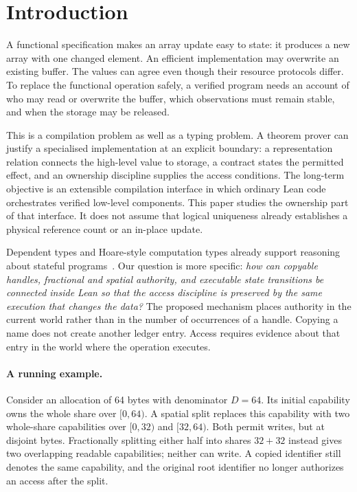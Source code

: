 \documentclass[a4paper,UKenglish,cleveref]{lipics-v2021}
\begin{document}
\section{Introduction}

A functional specification makes an array update easy to state: it produces a
new array with one changed element. An efficient implementation may overwrite
an existing buffer. The values can agree even though their resource protocols
differ. To replace the functional operation safely, a verified program needs an
account of who may read or overwrite the buffer, which observations must remain
stable, and when the storage may be released.

This is a compilation problem as well as a typing problem. A theorem prover can
justify a specialised implementation at an explicit boundary: a representation
relation connects the high-level value to storage, a contract states the
permitted effect, and an ownership discipline supplies the access conditions.
The long-term objective is an extensible compilation interface in which ordinary
Lean code orchestrates verified low-level components. This paper studies the
ownership part of that interface. It does not assume that logical uniqueness
already establishes a physical reference count or an in-place update.

Dependent types and Hoare-style computation types already support reasoning
about stateful programs~\cite{htt,ynot,steelcore}. Our question is more specific:
\emph{how can copyable handles, fractional and spatial authority, and executable
state transitions be connected inside Lean so that the access discipline is
preserved by the same execution that changes the data?} The proposed mechanism
places authority in the current world rather than in the number of occurrences
of a handle. Copying a name does not create another ledger entry. Access requires
evidence about that entry in the world where the operation executes.

\paragraph*{A running example.}
Consider an allocation of 64 bytes with denominator $D=64$. Its initial
capability owns the whole share over $[0,64)$. A spatial split replaces this
capability with two whole-share capabilities over $[0,32)$ and $[32,64)$.
Both permit writes, but at disjoint bytes. Fractionally splitting either half
into shares $32+32$ instead gives two overlapping readable capabilities; neither
can write. A copied identifier still denotes the same capability, and the
original root identifier no longer authorizes an access after the split.
\end{document}
